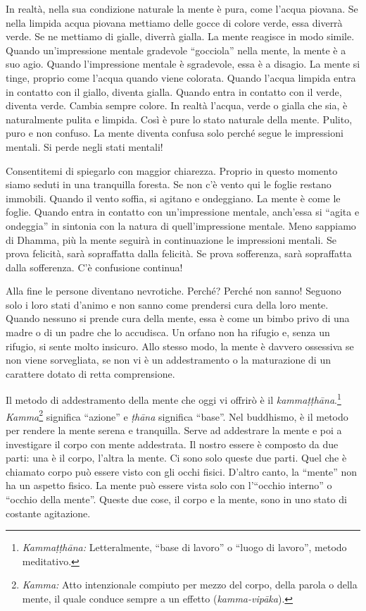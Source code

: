 In realtà, nella sua condizione naturale la mente è pura, come l'acqua
piovana. Se nella limpida acqua piovana mettiamo delle gocce di colore
verde, essa diverrà verde. Se ne mettiamo di gialle, diverrà gialla. La
mente reagisce in modo simile. Quando un'impressione mentale gradevole
``gocciola'' nella mente, la mente è a suo agio. Quando l'impressione
mentale è sgradevole, essa è a disagio. La mente si tinge, proprio come
l'acqua quando viene colorata. Quando l'acqua limpida entra in contatto
con il giallo, diventa gialla. Quando entra in contatto con il verde,
diventa verde. Cambia sempre colore. In realtà l'acqua, verde o gialla
che sia, è naturalmente pulita e limpida. Così è pure lo stato naturale
della mente. Pulito, puro e non confuso. La mente diventa confusa solo
perché segue le impressioni mentali. Si perde negli stati mentali!

Consentitemi di spiegarlo con maggior chiarezza. Proprio in questo
momento siamo seduti in una tranquilla foresta. Se non c'è vento qui le
foglie restano immobili. Quando il vento soffia, si agitano e
ondeggiano. La mente è come le foglie. Quando entra in contatto con
un'impressione mentale, anch'essa si ``agita e ondeggia'' in sintonia
con la natura di quell'impressione mentale. Meno sappiamo di Dhamma, più
la mente seguirà in continuazione le impressioni mentali. Se prova
felicità, sarà sopraffatta dalla felicità. Se prova sofferenza, sarà
sopraffatta dalla sofferenza. C'è confusione continua!

Alla fine le persone diventano nevrotiche. Perché? Perché non sanno!
Seguono solo i loro stati d'animo e non sanno come prendersi cura della
loro mente. Quando nessuno si prende cura della mente, essa è come un
bimbo privo di una madre o di un padre che lo accudisca. Un orfano non
ha rifugio e, senza un rifugio, si sente molto insicuro. Allo stesso
modo, la mente è davvero ossessiva se non viene sorvegliata, se non vi è
un addestramento o la maturazione di un carattere dotato di retta
comprensione.

Il metodo di addestramento della mente che oggi vi offrirò è il
\emph{kammaṭṭhāna}.\footnote{\emph{Kammaṭṭhāna:} Letteralmente, ``base
  di lavoro'' o ``luogo di lavoro'', metodo meditativo.}
\emph{Kamma}\footnote{\emph{Kamma:} Atto intenzionale compiuto per mezzo
  del corpo, della parola o della mente, il quale conduce sempre a un
  effetto (\emph{kamma-vipāka}).} significa ``azione'' e \emph{ṭhāna}
significa ``base''. Nel buddhismo, è il metodo per rendere la mente
serena e tranquilla. Serve ad addestrare la mente e poi a investigare il
corpo con mente addestrata. Il nostro essere è composto da due parti:
una è il corpo, l'altra la mente. Ci sono solo queste due parti. Quel
che è chiamato corpo può essere visto con gli occhi fisici. D'altro
canto, la ``mente'' non ha un aspetto fisico. La mente può essere vista
solo con l'``occhio interno'' o ``occhio della mente''. Queste due cose,
il corpo e la mente, sono in uno stato di costante agitazione.

